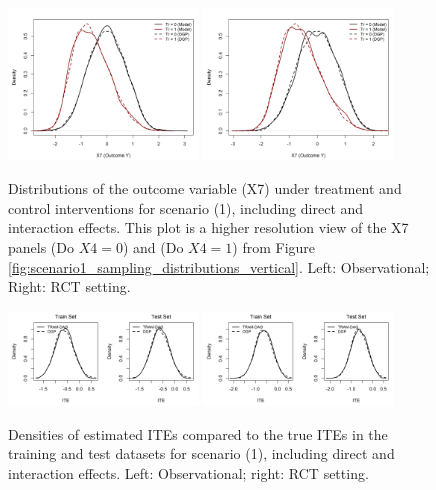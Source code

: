 \begin{figure}[htbp]
\centering
\includegraphics[width=0.45\textwidth]{img/results/observ_scenario1_X7_treatment_densities.png}
\includegraphics[width=0.45\textwidth]{img/results/rct_scenario1_X7_treatment_densities.png}
\caption{Distributions of the outcome variable (X7) under treatment and control interventions for scenario (1), including direct and interaction effects. This plot is a higher resolution view of the X7 panels (Do $X4=0$) and (Do $X4=1$) from Figure \ref{fig:scenario1_sampling_distributions_vertical}. Left: Observational; Right: RCT setting.}
\label{fig:scenario1_outcome_distributions}
\end{figure}




\begin{figure}[htbp]
\centering
\includegraphics[width=0.45\textwidth]{img/results/observ_scenario1_ITE_densities_train_test.png}
\includegraphics[width=0.45\textwidth]{img/results/rct_scenario1_ITE_densities_train_test.png}
\caption{Densities of estimated ITEs compared to the true ITEs in the training and test datasets for scenario (1), including direct and interaction effects. Left: Observational; right: RCT setting.}
\label{fig:scenario1_ite_densities_train_test}
\end{figure}






